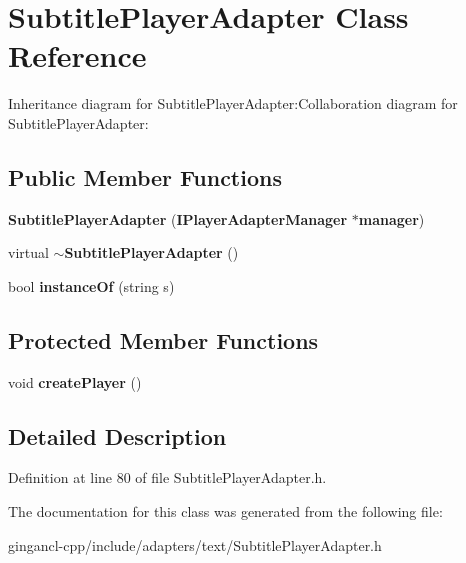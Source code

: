 \section{SubtitlePlayerAdapter Class Reference}
\label{classbr_1_1pucrio_1_1telemidia_1_1ginga_1_1ncl_1_1adapters_1_1text_1_1SubtitlePlayerAdapter}
Inheritance diagram for SubtitlePlayerAdapter:Collaboration diagram for SubtitlePlayerAdapter:\subsection*{Public Member Functions}
\begin{CompactItemize}
\item 
\textbf{SubtitlePlayerAdapter} ({\bf IPlayerAdapterManager} $\ast${\bf manager})\label{classbr_1_1pucrio_1_1telemidia_1_1ginga_1_1ncl_1_1adapters_1_1text_1_1SubtitlePlayerAdapter_c311f08643912937d4f122b82b3ddca8}

\item 
virtual {\bf $\sim$SubtitlePlayerAdapter} ()\label{classbr_1_1pucrio_1_1telemidia_1_1ginga_1_1ncl_1_1adapters_1_1text_1_1SubtitlePlayerAdapter_40a1c7755b4445138b673e5c50d5de92}

\item 
bool \textbf{instanceOf} (string s)\label{classbr_1_1pucrio_1_1telemidia_1_1ginga_1_1ncl_1_1adapters_1_1text_1_1SubtitlePlayerAdapter_4081cb1ebb5adebc1d0858ff6f69af0d}

\end{CompactItemize}
\subsection*{Protected Member Functions}
\begin{CompactItemize}
\item 
void \textbf{createPlayer} ()\label{classbr_1_1pucrio_1_1telemidia_1_1ginga_1_1ncl_1_1adapters_1_1text_1_1SubtitlePlayerAdapter_2fbb9533e3d66799b0a433c9298ea70f}

\end{CompactItemize}


\subsection{Detailed Description}




Definition at line 80 of file SubtitlePlayerAdapter.h.

The documentation for this class was generated from the following file:\begin{CompactItemize}
\item 
gingancl-cpp/include/adapters/text/SubtitlePlayerAdapter.h\end{CompactItemize}
